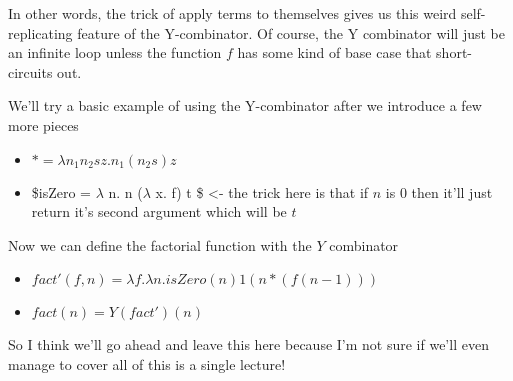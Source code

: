 \documentclass[11pt]{article}
\begin{document}
In other words, the trick of apply terms to themselves gives us this weird self-replicating feature of the Y-combinator. Of course, the Y combinator will just be an infinite loop unless the function $f$ has some kind of base case that short-circuits out.

We'll try a basic example of using the Y-combinator after we introduce a few more pieces

\begin{itemize}
\item $* = \lambda n_1 n_2 s z. n_1 (n_2 s) z$
\item \$isZero = $\lambda$ n. n ($\lambda$ x. f) t \$ <- the trick here is that if $n$ is 0 then it'll just return it's second argument which will be $t$
\end{itemize}
Now we can define the factorial function with the $Y$ combinator 
\begin{itemize}
\item $fact'(f,n) = \lambda f. \lambda n. isZero(n) 1 (n*(f(n-1)))$
\item $fact(n) = Y(fact')(n)$
\end{itemize}

So I think we'll go ahead and leave this here because I'm not sure if we'll even manage to cover all of this is a single lecture!
\end{document}

